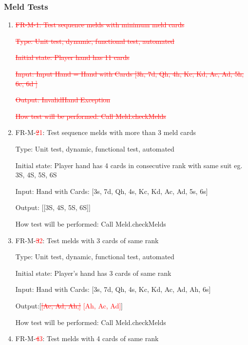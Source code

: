\documentclass[12pt, titlepage]{article}
\begin{document}
\subsubsection{Meld Tests}
\begin{enumerate}
    \item \textcolor{red}{\sout{{FR-M-1: Test sequence melds with minimum meld cards}}}
    
    \textcolor{red}{\sout{Type: Unit test, dynamic, functional test, automated}}
    
    \textcolor{red}{\sout{Initial state: Player hand has 11 cards}}
    
    \textcolor{red}{\sout{Input: Input Hand = Hand with Cards [3h, 7d, Qh, 4h, Kc, Kd, Ac, Ad, 5h, 6c, 6d ]}}
    
    \textcolor{red}{\sout{Output: InvalidHand Exception}}
    
    \textcolor{red}{\sout{How test will be performed: Call Meld.checkMelds}}
    
    \item{FR-M-\textcolor{red}{\sout{{2}}1}: Test sequence melds with more than 3 meld cards}
    
    Type: Unit test, dynamic, functional test, automated
    
    Initial state: Player hand has 4 cards in consecutive rank with same suit eg. 3S, 4S, 5S, 6S
    
    Input: Hand with Cards: [3s, 7d, Qh, 4s, Kc, Kd, Ac, Ad, 5s, 6s]
    
    Output: [[3S, 4S, 5S, 6S]] 
    
    How test will be performed: Call Meld.checkMelds
    
    \item{FR-M-\textcolor{red}{\sout{{3}}2}: Test melds with 3 cards of same rank}
    
    Type: Unit test, dynamic, functional test, automated 
    
    Initial state: Player's hand has 3 cards of same rank
    
    Input: Hand with Cards: [3s, 7d, Qh, 4s, Kc, Kd, Ac, Ad, Ah, 6s]
    
    Output:[\textcolor{red}{\sout{[Ac, Ad, Ah,]} [Ah, Ac, Ad]}]
    
    How test will be performed: Call Meld.checkMelds
    
    \item{FR-M-\textcolor{red}{\sout{{4}}3}: Test melds with 4 cards of same rank}
    

\end{enumerate}
\end{document}
